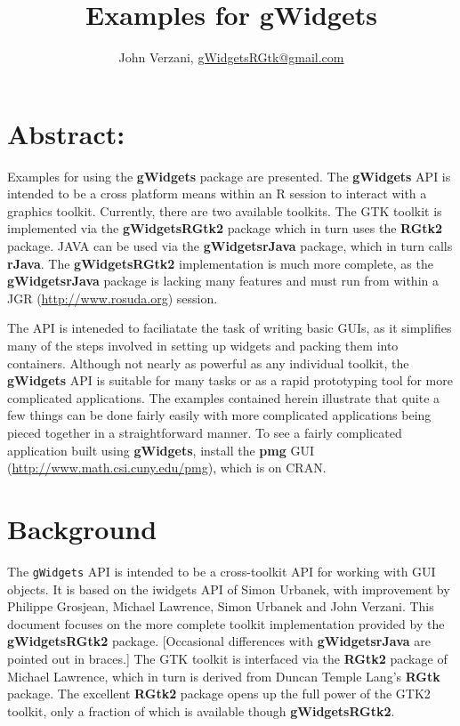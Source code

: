 \documentclass[12pt]{article}
\newcommand{\RCode}[1]{\texttt{#1}}
\newcommand{\RPackage}[1]{\textbf{#1}}
\begin{document}
\thispagestyle{plain}
\title{Examples for gWidgets}

\author{John Verzani, \url{gWidgetsRGtk@gmail.com}}
\maketitle

\section*{Abstract:}
Examples for using the \RPackage{gWidgets} package are presented.  The
\RPackage{gWidgets} API is intended to be a cross platform means
within an R session to interact with a graphics toolkit.  Currently,
there are two available toolkits. The GTK toolkit is implemented via
the \RPackage{gWidgetsRGtk2} package which in turn uses the
\RPackage{RGtk2} package.  JAVA can be used via the
\RPackage{gWidgetsrJava} package, which in turn calls
\RPackage{rJava}. The \RPackage{gWidgetsRGtk2} implementation is much
more complete, as the \RPackage{gWidgetsrJava} package is lacking many
features and must run from within a JGR (\url{http://www.rosuda.org})
session.


The API is inteneded to faciliatate the task of writing basic GUIs, as
it simplifies many of the steps involved in setting up widgets and
packing them into containers. Although not nearly as powerful as any
individual toolkit, the \RPackage{gWidgets} API is suitable for many
tasks or as a rapid prototyping tool for more complicated
applications. The examples contained herein illustrate that quite a
few things can be done fairly easily with more complicated
applications being pieced together in a straightforward manner.  To
see a fairly complicated application built using \RPackage{gWidgets},
install the \RPackage{pmg} GUI
(\url{http://www.math.csi.cuny.edu/pmg}), which is on CRAN.


\setcounter{tocdepth}{3}
\tableofcontents

\section{Background}
The \RCode{gWidgets} API is intended to be a cross-toolkit API for
working with GUI objects. It is based on the iwidgets API of Simon
Urbanek, with improvement by Philippe Grosjean, Michael Lawrence,
Simon Urbanek and John Verzani.  This document focuses on the more
complete toolkit implementation provided by the
\RPackage{gWidgetsRGtk2} package. [Occasional differences with
\RPackage{gWidgetsrJava} are pointed out in braces.] The GTK toolkit
is interfaced via the \RPackage{RGtk2} package of Michael Lawrence,
which in turn is derived from Duncan Temple Lang's \RPackage{RGtk}
package. The excellent \RPackage{RGtk2} package opens up the full
power of the GTK2 toolkit, only a fraction of which is available
though \RPackage{gWidgetsRGtk2}.
\end{document}
